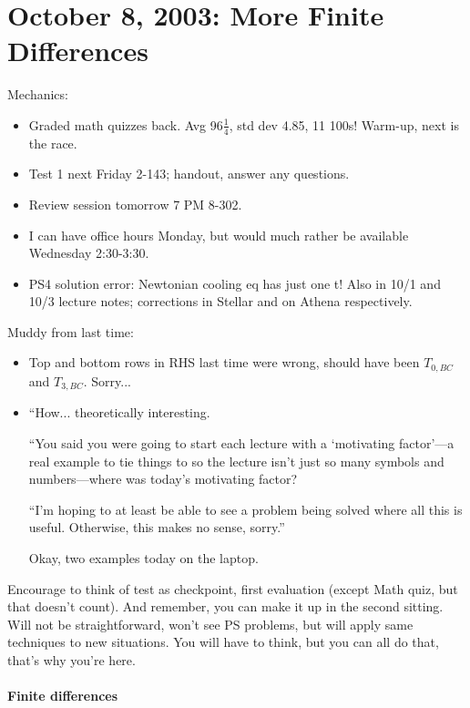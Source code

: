 \documentclass{report}
\begin{document}
\section{October 8, 2003: More Finite Differences}

Mechanics:
\begin{itemize}
\item Graded math quizzes back.  Avg 96$\frac{1}{4}$, std dev 4.85, 11 100s!
  Warm-up, next is the race.
\item Test 1 next Friday 2-143; handout, answer any questions.
\item Review session tomorrow 7 PM 8-302.
\item I can have office hours Monday, but would much rather be available
  Wednesday 2:30-3:30.
\item PS4 solution error: Newtonian cooling eq has just one t!  Also in 10/1
  and 10/3 lecture notes; corrections in Stellar and on Athena respectively.
\end{itemize}

\noindent Muddy from last time:
\begin{itemize}
\item Top and bottom rows in RHS last time were wrong, should have been
  $T_{0,BC}$ and $T_{3,BC}$.  Sorry...
\item ``How... theoretically interesting.

  ``You said you were going to start each lecture with a `motivating
  factor'---a real example to tie things to so the lecture isn't just so many
  symbols and numbers---where was today's motivating factor?

  ``I'm hoping to at least be able to see a problem being solved where all this
  is useful.  Otherwise, this makes no sense, sorry.''

  Okay, two examples today on the laptop.
\end{itemize}

Encourage to think of test as checkpoint, first evaluation (except Math quiz,
but that doesn't count).  And remember, you can make it up in the second
sitting.  Will not be straightforward, won't see PS problems, but will apply
same techniques to new situations.  You will have to think, but you can all do
that, that's why you're here.

\paragraph{Finite differences}
\end{document}
